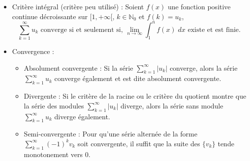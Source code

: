 \documentclass[a4paper]{article}
\begin{document}
\begin{itemize}
\item Critère intégral (critère peu utilisé) : Soient $ f(x) $ une fonction positive continue décroissante sur $ [1, +\infty[ $, $ k \in \mathbb{N}_0 $ et $ f(k) = u_k $, 
\[ \sum_{k=1}^{\infty} u_k \text{ converge si et seulement si, } \lim_{n \to \infty} \int_1^n f(x) \; dx \text{ existe et est finie. } \]





\item Convergence : 

\begin{center}
\end{center}

\begin{itemize}
\item Absolument convergente : Si la série $\displaystyle \sum_{k=1}^{\infty} |u_k| $ converge, alors la série $\displaystyle \sum_{k=1}^{\infty} u_k $ converge également et est dite absolument convergente.
\item Divergente : Si le critère de la racine ou le critère du quotient montre que la série des modules $\displaystyle \sum_{k=1}^{\infty} |u_k| $ diverge, alors la série sans module $\displaystyle \sum_{k=1}^{\infty} u_k $ diverge également.
\item Semi-convergente : Pour qu'une série alternée de la forme $\displaystyle \sum_{k=1}^{\infty} (-1)^k v_k $ soit convergente, il suffit que la suite des $ \{ v_k \} $ tende monotonement vers 0.
\end{itemize}







\end{itemize}
\end{document}

